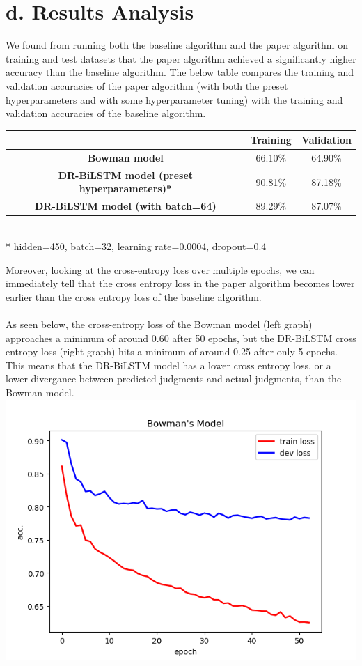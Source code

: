 \documentclass[12pt,letterpaper]{article}
\begin{document}
\section*{d. Results Analysis}
We found from running both the baseline algorithm and the paper algorithm on training and test datasets that the paper algorithm achieved a significantly higher accuracy than the baseline algorithm. The below table compares the training and validation accuracies of the paper algorithm (with both the preset hyperparameters and with some hyperparameter tuning) with the training and validation accuracies of the baseline algorithm. 
\begin{center}
    \begin{tabular}{| c | c | c |}
        \hline
         & \textbf{Training} & \textbf{Validation}\\ \hline
        \textbf{Bowman model} & 66.10$\%$ & 64.90$\%$
        \\ \hline
        \textbf{DR-BiLSTM model (preset hyperparameters)*} & 90.81$\%$ & 87.18$\%$\\ \hline
        \textbf{DR-BiLSTM model (with batch=64)} & 89.29$\%$ & 87.07$\%$\\ \hline
    \end{tabular} \\
    * hidden=450, batch=32, learning rate=0.0004, dropout=0.4 \\
\end{center}
Moreover, looking at the cross-entropy loss over multiple epochs, we can immediately tell that the cross entropy loss in the paper algorithm becomes lower earlier than the cross entropy loss of the baseline algorithm. \\
\\
As seen below, the cross-entropy loss of the Bowman model (left graph) approaches a minimum of around 0.60 after 50 epochs, but the DR-BiLSTM cross entropy loss (right graph) hits a minimum of around 0.25 after only 5 epochs. This means that the DR-BiLSTM model has a lower cross entropy loss, or a lower divergance between predicted judgments and actual judgments, than the Bowman model.\\
\includegraphics[scale=0.53]{Bowmanxent.PNG}
\end{document}
